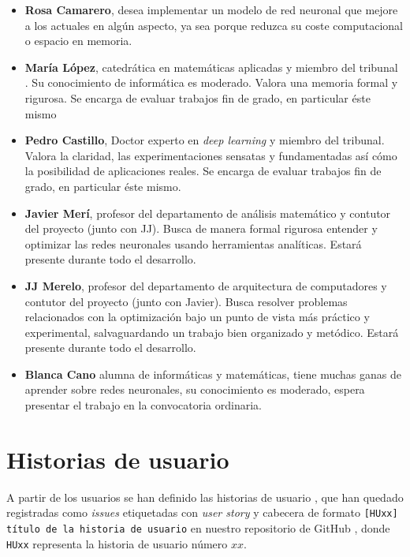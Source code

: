 \begin{itemize}

    \item \textbf{Rosa Camarero}, desea implementar un modelo de red neuronal que mejore a los actuales en algún aspecto, ya sea porque reduzca su coste computacional o espacio en memoria. 

    \item \textbf{María López}, catedrática en matemáticas aplicadas y miembro del tribunal . Su conocimiento
    de informática es moderado. Valora una memoria formal y rigurosa. Se encarga de evaluar trabajos fin de grado, en particular éste mismo
    
    \item \textbf{Pedro Castillo}, Doctor experto en \textit{deep learning} y miembro del tribunal. Valora la claridad, las experimentaciones sensatas y fundamentadas así cómo la posibilidad de aplicaciones reales. Se encarga de evaluar trabajos fin de grado, en particular éste mismo. 
    
    \item \textbf{Javier Merí}, profesor del departamento de análisis matemático y contutor del proyecto (junto con JJ). Busca de manera formal rigurosa entender y optimizar las redes neuronales usando herramientas analíticas. Estará presente durante todo el desarrollo. 
    
    \item   \textbf{JJ Merelo}, profesor del departamento de arquitectura de computadores y contutor del proyecto (junto con Javier). 
    Busca resolver problemas relacionados con la optimización bajo un punto de vista más práctico y experimental, salvaguardando un trabajo bien organizado y metódico. Estará presente durante todo el desarrollo. 

    \item \textbf{Blanca Cano} alumna de informáticas y matemáticas, tiene muchas ganas de aprender sobre redes 
    neuronales, su conocimiento es moderado, espera presentar el trabajo en la convocatoria ordinaria. 

\end{itemize}

\section{Historias de usuario}   \label{ch:metodología_personas_historias_de_usuario}

A partir de los usuarios se han definido las historias de usuario \cite{UserStories}, que han quedado registradas 
como \textit{issues} etiquetadas con \textit{user story} y cabecera de formato
\texttt{[HUxx] título de la historia de usuario} en nuestro 
repositorio de GitHub \cite{TFG-Estudio-de-las-redes-neuronales},
 donde \texttt{HUxx} representa
la historia de usuario número $xx$.   


